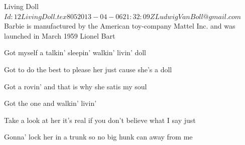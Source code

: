 \begin{SBSong}{Living Doll}
  {$Id: 12LivingDoll.tex 805 2013-04-06 21:32:09Z LudwigVanBoll@gmail.com $}
  {Barbie is manufactured by the American toy-company Mattel Inc. and was launched in March 1959}
  {Lionel Bart}
  \begin{SBChorus}
    Got myself a  talkin' sleepin' walkin' livin' doll
    
    Got to do the best to please her just cause she's a  doll
    
    Got a rovin'  and that is why she satis my soul
    
    Got the one and  walkin'  livin'  
  \end{SBChorus}
  \begin{SBVerse}
    Take a look at her  it's real if you don't believe what I say just 
    
    Gonna' lock her  in a trunk so no big hunk can   away from me
  \end{SBVerse}
\end{SBSong}
